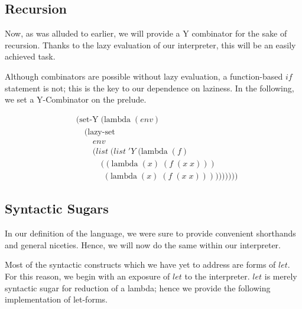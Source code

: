 \subsection{Recursion}
Now, as was alluded to earlier, we will provide a Y combinator for the 
sake of recursion. Thanks to the lazy evaluation of our interpreter, this 
will be an easily achieved task.

Although combinators are possible without lazy evaluation, a function-based 
$if$ statement is not; this is the key to our dependence on laziness. In the 
following, we set a Y-Combinator on the prelude.

\begin{figure}[ht]
\caption{}\label{scheme}
\begin{align*}
& (\text{set-Y} \; (\text{lambda} \; (env)
\\& \quad (\text{lazy-set}
\\& \qquad env
\\& \qquad (list \; (list \; 'Y \; (\text{lambda} \; (f) \; 
\\& \qquad \quad ((\text{lambda} \; (x) \; (f \; (x \; x))) \; 
\\& \qquad \quad \; (\text{lambda} \; (x) \; (f \; (x \; x))))))))))
\end{align*}
\end{figure}

\subsection{Syntactic Sugars}
In our definition of the language, we were sure to provide convenient 
shorthands and general niceties. Hence, we will now do the same within our 
interpreter.

Most of the syntactic constructs which we have yet to address are forms of 
$let$. For this reason, we begin with an exposure of $let$ to the 
interpreter. $let$ is merely syntactic sugar for reduction of a lambda; hence 
we provide the following implementation of let-forms.


